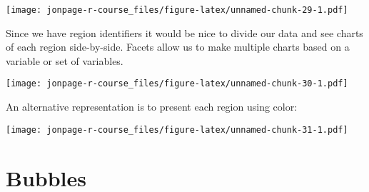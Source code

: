 \documentclass[]{book}
\newenvironment{Shaded}{\begin{snugshade}}{\end{snugshade}}
\newcommand{\KeywordTok}[1]{\textcolor[rgb]{0.13,0.29,0.53}{\textbf{{#1}}}}
\newcommand{\DataTypeTok}[1]{\textcolor[rgb]{0.13,0.29,0.53}{{#1}}}
\newcommand{\DecValTok}[1]{\textcolor[rgb]{0.00,0.00,0.81}{{#1}}}
\newcommand{\FloatTok}[1]{\textcolor[rgb]{0.00,0.00,0.81}{{#1}}}
\newcommand{\StringTok}[1]{\textcolor[rgb]{0.31,0.60,0.02}{{#1}}}
\newcommand{\OtherTok}[1]{\textcolor[rgb]{0.56,0.35,0.01}{{#1}}}
\newcommand{\NormalTok}[1]{{#1}}
\theoremstyle{definition}
\theoremstyle{definition}
\theoremstyle{remark}
\begin{document}
\texttt{[image: jonpage-r-course\_files/figure-latex/unnamed-chunk-29-1.pdf]}

Since we have region identifiers it would be nice to divide our data and
see charts of each region side-by-side. Facets allow us to make multiple
charts based on a variable or set of variables.

\begin{Shaded}
\end{Shaded}

\texttt{[image: jonpage-r-course\_files/figure-latex/unnamed-chunk-30-1.pdf]}

An alternative representation is to present each region using color:

\begin{Shaded}
\end{Shaded}

\texttt{[image: jonpage-r-course\_files/figure-latex/unnamed-chunk-31-1.pdf]}

\section{Bubbles}\label{bubbles}
\end{document}
